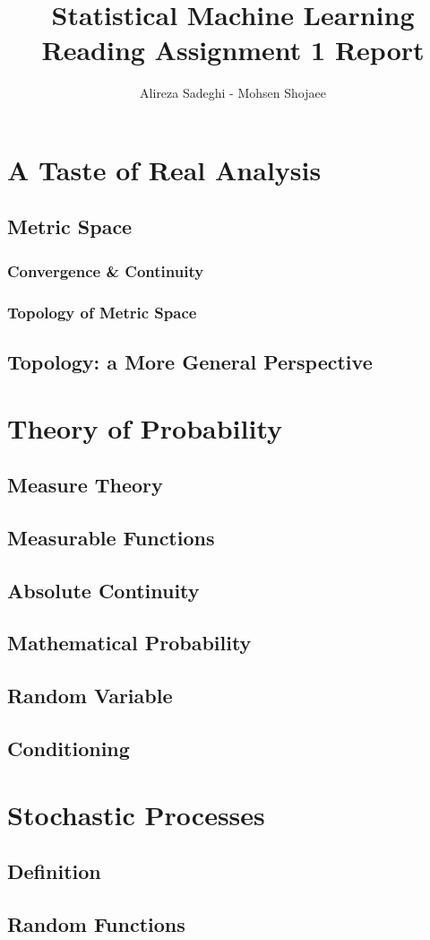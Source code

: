 \documentclass{article}
\title{Statistical Machine Learning \\ Reading Assignment 1 Report}
\author{Alireza Sadeghi - Mohsen Shojaee}
\begin{document}
\maketitle
    
\section{A Taste of Real Analysis}

\subsection{Metric Space}

\subsubsection{Convergence \& Continuity}

\subsubsection{Topology of Metric Space}

\subsection{Topology: a More General Perspective}

\section{Theory of Probability}

\subsection{Measure Theory}

\subsection{Measurable Functions}

\subsection{Absolute Continuity}

\subsection{Mathematical Probability}

\subsection{Random Variable}

\subsection{Conditioning}

\section{Stochastic Processes}

\subsection{Definition}

\subsection{Random Functions}
\end{document}
